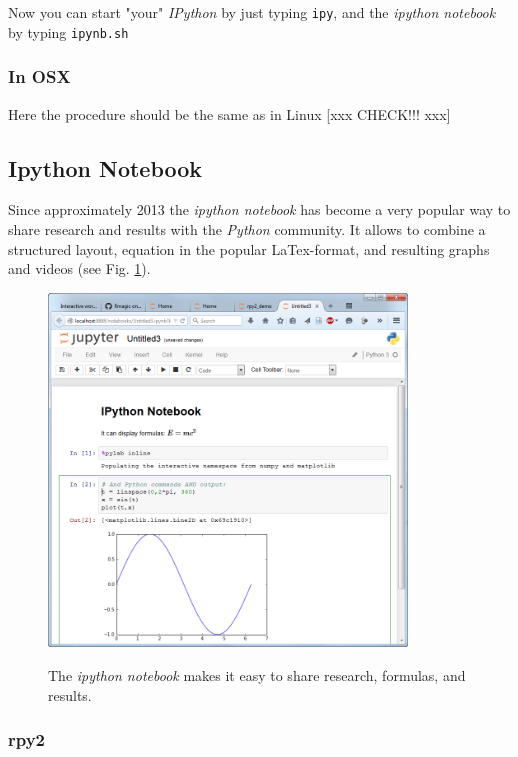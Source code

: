 Now you can start "your" \emph{IPython} by just typing \lstinline{ipy}, and the \emph{ipython notebook} by typing \lstinline{ipynb.sh}

\subsubsection{In OSX}

Here the procedure should be the same as in Linux [xxx CHECK!!! xxx]

\subsection{Ipython Notebook}

Since approximately 2013 the \emph{ipython notebook} has become a very popular way to share research and results with the \emph{Python} community. It allows to combine a structured layout, equation in the popular LaTex-format, and resulting graphs and videos (see Fig. \ref{fig:ipythonNotebook}).

\begin{figure}[H]
  \centering
  \includegraphics[width=0.85\textwidth]{../Images/ipython-notebook.png}\\
  \caption{The \emph{ipython notebook} makes it easy to share research, formulas, and results.}
  \label{fig:ipythonNotebook}
\end{figure}

\subsubsection{rpy2}

